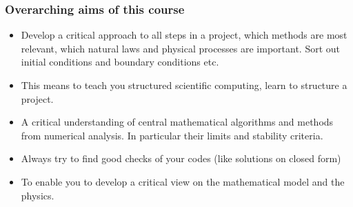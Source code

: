 \documentclass{beamer}
\begin{document}
\begin{frame}
\frametitle{Overarching aims of this course}

\begin{itemize}
  \item Develop a critical approach to all steps in a project, which methods are most relevant, which natural laws and physical processes are important. Sort out initial conditions and boundary conditions etc.

  \item This means to teach you structured scientific computing, learn to structure a project.

  \item A critical understanding of central mathematical algorithms and methods from numerical analysis. In particular their limits and stability criteria.

  \item Always try to find good checks of your codes (like solutions on closed form)

  \item To enable you to develop a critical view on the mathematical model and the physics.
\end{itemize}

\noindent
\end{frame}
\end{document}
